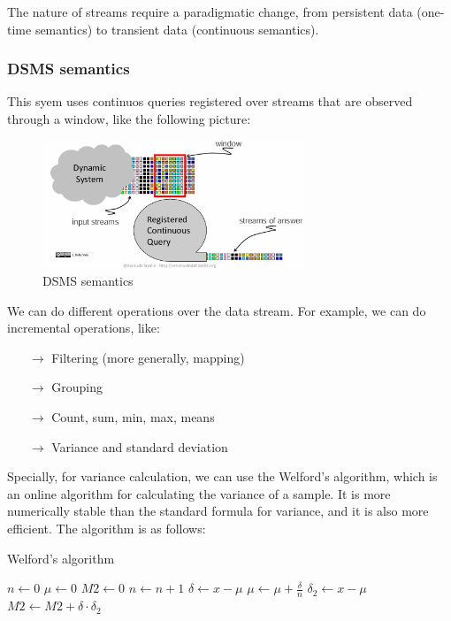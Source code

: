 The nature of streams require a paradigmatic change, from persistent data (one-time 
semantics) to transient data (continuous semantics). 

\subsubsection{DSMS semantics}

This syem uses continuos queries registered over streams that are observed through
a window, like the following picture:

\begin{figure}[H]
    \centering
    \includegraphics[width=0.7\textwidth]{figures/image_DSMS.png}
    \caption{DSMS semantics}
    \label{fig:1}
\end{figure}

We can do different operations over the data stream. For example, we can do incremental
operations, like:

\begin{itemize}
    \item[$\rightarrow$] Filtering (more generally, mapping)
    \item[$\rightarrow$] Grouping
    \item[$\rightarrow$] Count, sum, min, max, means
    \item[$\rightarrow$] Variance and standard deviation
\end{itemize}

Specially, for variance calculation, we can use the Welford's algorithm, which is an
online algorithm for calculating the variance of a sample. It is more numerically stable
than the standard formula for variance, and it is also more efficient. The algorithm
is as follows:

\begin{algorithm}[H]
    \caption{Welford's algorithm}
    \begin{algorithmic}[1]
        \State $n \gets 0$
        \State $\mu \gets 0$
        \State $M2 \gets 0$
        \State
            \State $n \gets n + 1$
            \State $\delta \gets x - \mu$
            \State $\mu \gets \mu + \frac{\delta}{n}$
            \State $\delta_2 \gets x - \mu$
            \State $M2 \gets M2 + \delta \cdot \delta_2$
        \EndProcedure
    \end{algorithmic}
\end{algorithm}

